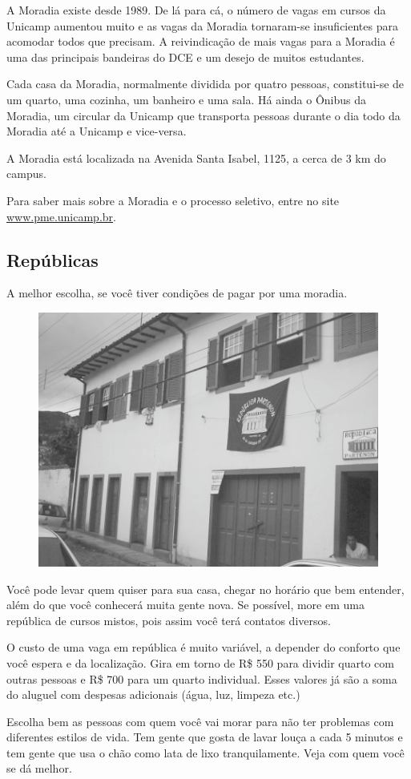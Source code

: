 A Moradia existe desde 1989. De lá para cá, o número de vagas em cursos da
Unicamp aumentou muito e as vagas da Moradia tornaram-se insuficientes para
acomodar todos que precisam. A reivindicação de mais vagas para a Moradia é uma
das principais bandeiras do DCE e um desejo de muitos estudantes.

Cada casa da Moradia, normalmente dividida por quatro pessoas, constitui-se de
um quarto, uma cozinha, um banheiro e uma sala. Há ainda o Ônibus da Moradia, um
circular da Unicamp que transporta pessoas durante o dia todo da Moradia até a
Unicamp e vice-versa.

A Moradia está localizada na Avenida Santa Isabel, 1125, a cerca de 3 km do
campus.

Para saber mais sobre a Moradia e o processo seletivo, entre no site
\url{www.pme.unicamp.br}.

\subsection{Repúblicas}

A melhor escolha, se você tiver condições de pagar por uma moradia.

\begin{figure}[h!]
    \centering
    \includegraphics[width=.45\textwidth]{img/barao/republica.jpg}
\end{figure}

Você pode levar quem quiser para sua casa, chegar no horário que bem entender,
além do que você conhecerá muita gente nova. Se possível, more em uma república
de cursos mistos, pois assim você terá contatos diversos.

O custo de uma vaga em república é muito variável, a depender do conforto que
você espera e da localização. Gira em torno de R\$ 550 para dividir quarto com
outras pessoas e R\$ 700 para um quarto individual. Esses valores já são a soma
do aluguel com despesas adicionais (água, luz, limpeza etc.)

Escolha bem as pessoas com quem você vai morar para não ter problemas com
diferentes estilos de vida. Tem gente que gosta de lavar louça a cada 5 minutos
e tem gente que usa o chão como lata de lixo tranquilamente. Veja com quem você
se dá melhor.

